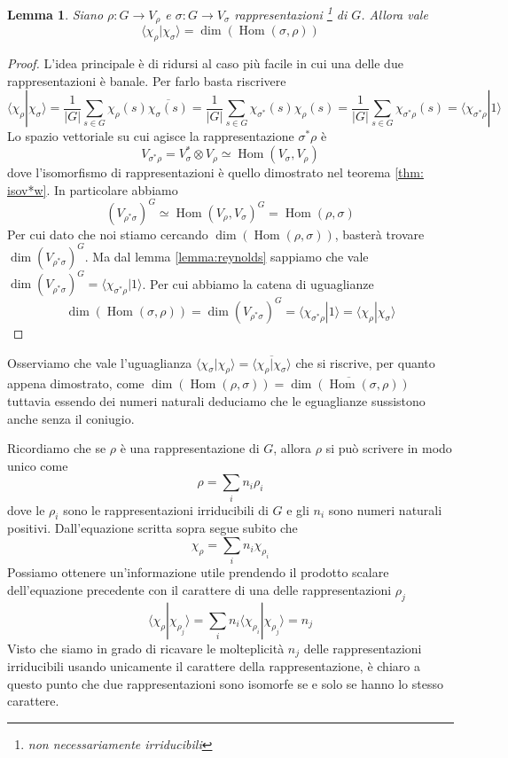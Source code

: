 \documentclass[11pt]{article}
\theoremstyle{plain}
\newtheorem{lemma}[thm]{Lemma}
\theoremstyle{definition}
\theoremstyle{remark}
\newcommand{\dsum}{\displaystyle\sum}
\DeclareMathOperator{\Hom}{Hom}
\DeclareMathOperator{\iso}{\simeq}
\begin{document}
\begin{lemma}
\label{lemma:dim_hom}
Siano $\rho:G\to V_\rho$ e $\sigma:G\to V_\sigma$ rappresentazioni \footnote{non necessariamente irriducibili} di $G$. Allora vale
\[ \langle \chi_\rho | \chi_\sigma \rangle  = \dim(\Hom (\sigma, \rho))\]
\end{lemma}
\begin{proof}
L'idea principale è di ridursi al caso più facile in cui una delle due rappresentazioni è banale. Per farlo basta riscrivere
\[ \langle \chi_\rho | \chi_\sigma \rangle = \dfrac{1}{|G|} \dsum_{s\in G} \chi_\rho(s) \overline{\chi_\sigma(s)} = \dfrac{1}{|G|} \dsum_{s\in G} {\chi_{\sigma^*}(s)} \chi_{\rho}(s) = \dfrac{1}{|G|} \dsum_{s\in G} \chi_{\sigma^*\rho}(s)  = \langle \chi_{\sigma^*\rho}  | 1 \rangle\]
Lo spazio vettoriale su cui agisce la rappresentazione $\sigma^*\rho$ è
\[ V_{\sigma^* \rho} = V_{\sigma}^* \otimes V_\rho \iso \Hom(V_\sigma, V_\rho)\]
dove l'isomorfismo di rappresentazioni è quello dimostrato nel teorema \ref{thm: isov*w}.
In particolare abbiamo
\[ (V_{\rho^*\sigma})^G \iso \Hom(V_\rho, V_\sigma)^G = \Hom(\rho, \sigma)\]
Per cui dato che noi stiamo cercando $\dim(\Hom(\rho, \sigma))$, basterà trovare $\dim(V_{\rho^*\sigma})^G$.
Ma dal lemma \ref{lemma:reynolds} sappiamo che vale $\dim(V_{\rho^*\sigma})^G = \langle \chi_{\sigma^*\rho}  | 1 \rangle$.
Per cui abbiamo la catena di uguaglianze
\[\dim(\Hom(\sigma, \rho)) = \dim(V_{\rho^*\sigma})^G = \langle \chi_{\sigma^*\rho} | 1 \rangle = \langle \chi_\rho | \chi_\sigma \rangle\]
\end{proof}

Osserviamo che vale l'uguaglianza
$\langle \chi_\sigma | \chi_\rho \rangle=\overline{\langle \chi_\rho | \chi_\sigma \rangle}$
che si riscrive, per quanto appena dimostrato, come
$\dim(\Hom(\rho, \sigma))=\overline{\dim(\Hom(\sigma, \rho))}$
tuttavia essendo dei numeri naturali deduciamo che le eguaglianze sussistono anche senza il coniugio.


  Ricordiamo che se $\rho$ è una rappresentazione di $G$, allora $\rho$ si può scrivere in modo unico come
    \[ \rho = \dsum_i n_i \rho_i\]
    dove le $\rho_i$ sono le rappresentazioni irriducibili di $G$ e gli $n_i$ sono numeri naturali positivi. Dall'equazione scritta sopra segue subito che
    \[ \chi_\rho = \dsum_i n_i \chi_{\rho_i}\]
    Possiamo ottenere un'informazione utile prendendo il prodotto scalare dell'equazione precedente con il carattere di una delle rappresentazioni $\rho_j$
    \[ \langle \chi_\rho | \chi_{\rho_j} \rangle = \dsum_i n_i \langle \chi_{\rho_i} | \chi_{\rho_j} \rangle = n_j \]
    Visto che siamo in grado di ricavare le molteplicità $n_j$ delle rappresentazioni irriducibili usando unicamente il carattere della rappresentazione,
    è chiaro a questo punto che due rappresentazioni sono isomorfe se e solo se hanno lo stesso carattere.
  
\end{document}
